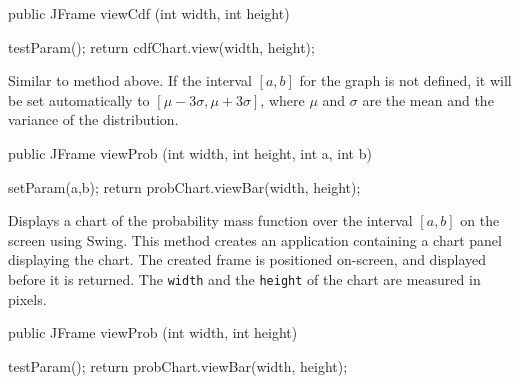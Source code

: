 \begin{htmlonly}
\end{htmlonly}
\begin{code}

   public JFrame viewCdf (int width, int height) \begin{hide} {
      testParam();
      return cdfChart.view(width, height);
   }\end{hide}
\end{code}
\begin{tabb}
 Similar to method  above.
 If the interval $[a,b]$ for the graph is
 not defined, it will be  set automatically to $[\mu - 3\sigma, \mu + 3\sigma]$,
 where $\mu$ and $\sigma$ are the mean and the variance of the distribution.
\end{tabb}
\begin{htmlonly}
\end{htmlonly}
\begin{code}

   public JFrame viewProb (int width, int height, int a, int b) \begin{hide} {
      setParam(a,b);
      return probChart.viewBar(width, height);
   }\end{hide}
\end{code}
\begin{tabb}
   Displays a chart of the probability mass function over the interval $[a,b]$
   on the screen using Swing. This method creates an application containing
   a chart panel displaying the chart. The created frame is positioned
   on-screen, and displayed before it is returned. The \texttt{width} and
   the \texttt{height} of the chart are measured in pixels.
\end{tabb}
\begin{htmlonly}
\end{htmlonly}
\begin{code}

   public JFrame viewProb (int width, int height) \begin{hide} {
      testParam();
      return probChart.viewBar(width, height);
   }\end{hide}
\end{code}
